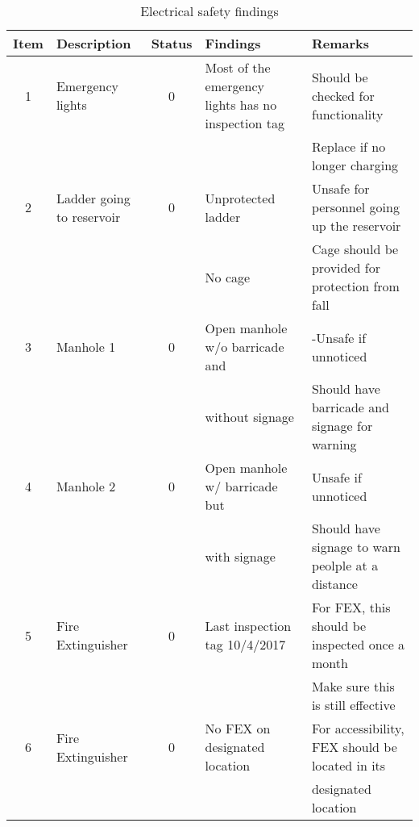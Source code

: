 \begin{table}[!h]
	\caption{Electrical safety findings}
	\label{ch04_tbl_fdas_safety01}
	{\scriptsize
\begin{tabular}{c|p{2cm}|c|p{5cm}|p{5cm}}
	\hline
	Item & Description & Status & Findings & Remarks \\ 
	\hline
	1 & Emergency lights & 0 & Most of the emergency lights has no inspection tag & Should be checked for functionality \\ 
	&  &  &  & Replace if no longer charging \\ 
	\hline
	2 & Ladder going to reservoir & 0 & Unprotected ladder & Unsafe for personnel going up the reservoir \\ 
	&  &  & No cage  & Cage should be provided for protection from fall \\ 
	\hline
	3 & Manhole 1 & 0 & Open manhole w/o barricade and & -Unsafe if unnoticed \\ 
	&  &  & without signage & Should have barricade and signage for warning \\ 
	\hline
	4 & Manhole 2 & 0 & Open manhole w/ barricade but  & Unsafe if unnoticed \\ 
	&  &  & with signage & Should have signage to warn peolple at a distance \\ 
	\hline
	5 & Fire Extinguisher & 0 & Last inspection tag  10/4/2017 & For FEX, this should be inspected once a month \\ 
	&  &  &  & Make sure this is still effective  \\ 
	\hline
	6 & Fire Extinguisher & 0 & No FEX on designated location & For accessibility, FEX should be located in its  \\ 
	&  &  &  & designated location \\ 
	\hline
\end{tabular}

	}
\end{table}
